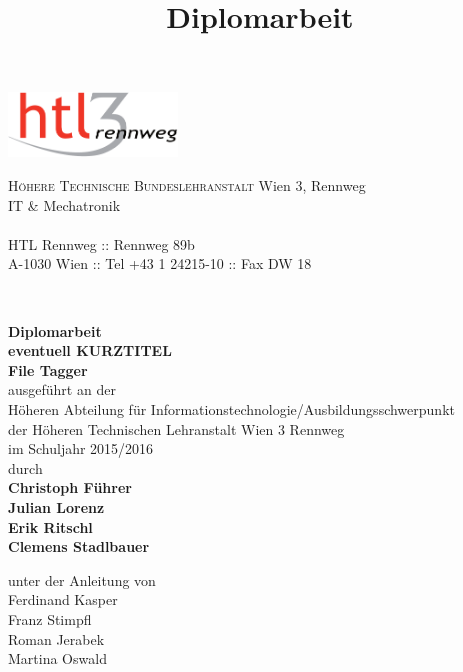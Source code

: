 \documentclass[12pt,a4paper,english,oneside,openright,DIV=12,BCOR=1cm]{scrbook}
\begin{document}
\title{Diplomarbeit}
\begin{titlepage}
\begin{minipage}[b]{1\columnwidth}
\parbox[b]{50mm}{\includegraphics[width=45mm]{images/htl3r-logo}}
\hfill
\parbox[b]{130mm}{\footnotesize \textsc{Höhere Technische Bundeslehranstalt} Wien 3, Rennweg\\
IT \& Mechatronik\\
\\
HTL Rennweg :: Rennweg 89b\\
A-1030 Wien :: Tel +43 1 24215-10 :: Fax DW 18
}\\
\mbox{}
\end{minipage}

\vspace{1cm}


\begin{center}
\textbf{\LARGE{}Diplomarbeit}{\large{}}\\
{\large{}\vspace{15mm}
 }\textbf{\large{}eventuell KURZTITEL}\\
\textbf{\large{}File Tagger}\\
 \vspace{15mm}
 ausgeführt an der\\
 Höheren Abteilung für Informationstechnologie/Ausbildungsschwerpunkt\\
 der Höheren Technischen Lehranstalt Wien 3 Rennweg\\
 \vspace{1cm}
 im Schuljahr 2015/2016\\
 \vspace{1cm}
 durch\\
 \vspace{0.5cm}
\textbf{\large{}Christoph Führer}\\
\textbf{\large{}Julian Lorenz}\\
\textbf{\large{}Erik Ritschl}\\
\textbf{\large{}Clemens Stadlbauer}\\

\par\end{center}{\large \par}

\begin{center}
\vspace{20mm}
 \normalsize unter der Anleitung von\\
 \vspace{0.5cm}
 Ferdinand Kasper\\
Franz Stimpfl\\
Roman Jerabek\\
Martina Oswald \\
\par\end{center}


\end{titlepage}
\end{document}
